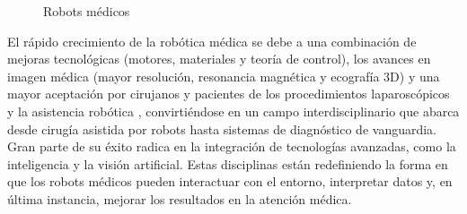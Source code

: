  \begin{figure}[H]
    \begin{center}
      \subcapcentertrue
      \hspace{20mm}
    \end{center}
    \caption{Robots médicos}
    \label{fig:Robots_medicos}
  \end{figure}

El rápido crecimiento de la robótica médica se debe a una combinación de mejoras tecnológicas (motores, materiales y teoría de control), los avances en imagen médica (mayor resolución, resonancia magnética y ecografía 3D) y una mayor aceptación por cirujanos y pacientes de los procedimientos laparoscópicos y la asistencia robótica \cite{Beasley12}, convirtiéndose en un campo interdisciplinario que abarca desde cirugía asistida por robots hasta sistemas de diagnóstico de vanguardia. Gran parte de su éxito radica en la integración de tecnologías avanzadas, como la inteligencia y la visión artificial. Estas disciplinas están redefiniendo la forma en que los robots médicos pueden interactuar con el entorno, interpretar datos y, en última instancia, mejorar los resultados en la atención médica.\\

